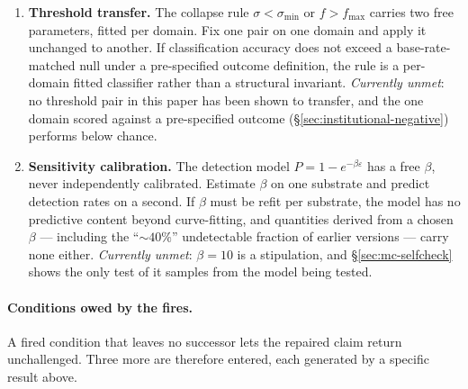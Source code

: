 \documentclass[11pt,a4paper]{article}
\theoremstyle{definition}
\theoremstyle{remark}
\begin{document}
\begin{enumerate}[noitemsep]
    \item \textbf{Threshold transfer.} The collapse rule $\sigma < \sigma_{\min}$ or $f > f_{\max}$ carries two free parameters, fitted per domain. Fix one pair on one domain and apply it unchanged to another. If classification accuracy does not exceed a base-rate-matched null under a pre-specified outcome definition, the rule is a per-domain fitted classifier rather than a structural invariant. \emph{Currently unmet}: no threshold pair in this paper has been shown to transfer, and the one domain scored against a pre-specified outcome (\S\ref{sec:institutional-negative}) performs below chance.
    \item \textbf{Sensitivity calibration.} The detection model $P = 1 - e^{-\beta\varepsilon}$ has a free $\beta$, never independently calibrated. Estimate $\beta$ on one substrate and predict detection rates on a second. If $\beta$ must be refit per substrate, the model has no predictive content beyond curve-fitting, and quantities derived from a chosen $\beta$ --- including the ``$\sim 40\%$'' undetectable fraction of earlier versions --- carry none either. \emph{Currently unmet}: $\beta = 10$ is a stipulation, and \S\ref{sec:mc-selfcheck} shows the only test of it samples from the model being tested.
\end{enumerate}

\paragraph{Conditions owed by the fires.}
A fired condition that leaves no successor lets the repaired claim return unchallenged. Three
more are therefore entered, each generated by a specific result above.
\end{document}
